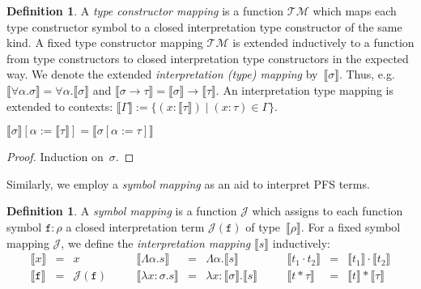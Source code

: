 \documentclass[a4paper,UKenglish,cleveref,autoref,numberwithinsect]{lipics-v2019}
\theoremstyle{definition}
\newtheorem{defn}[theorem]{Definition}
\newcommand{\arrtype}{\rightarrow}
\newcommand{\quant}[2]{\forall #1.#2}
\newcommand{\app}[2]{#1 \cdot #2}
\newcommand{\tapp}[2]{#1 * #2}
\newcommand{\abs}[2]{\lambda #1.#2}
\newcommand{\tabs}[2]{\Lambda #1.#2}
\newcommand{\typeinterpret}[1]{\llbracket #1 \rrbracket}
\newcommand{\interpret}[1]{\llbracket #1 \rrbracket}
\newcommand{\itp}[1]{\llbracket #1 \rrbracket}
\newcommand{\Typemap}{\mathcal{T\!M}}
\newcommand{\Termmap}{\mathcal{J}}
\begin{document}
\begin{defn}
  A \emph{type constructor mapping} is a function $\Typemap$ which
  maps each type constructor symbol to a closed interpretation type
  constructor of the same kind. A fixed type constructor mapping
  $\Typemap$ is extended inductively to a function from type
  constructors to closed interpretation type constructors in the
  expected way. We denote the extended \emph{interpretation (type)
    mapping} by~$\typeinterpret{\sigma}$. Thus,
  e.g.~$\typeinterpret{\quant{\alpha}{\sigma}} =
  \quant{\alpha}{\typeinterpret{\sigma}}$ and $\typeinterpret{\sigma
    \arrtype \tau} = \typeinterpret{\sigma} \arrtype
  \typeinterpret{\tau}$. An interpretation type mapping is extended to
  \pagebreak
  contexts: \( \itp{\Gamma} := \{ (x : \typeinterpret{\tau}) \mid (x :
  \tau) \in \Gamma \}.  \)
\end{defn}

\begin{lemma}\label{lem:substitutioninterpret:types}
  $\typeinterpret{\sigma}[\alpha:=\typeinterpret{\tau}] =
  \typeinterpret{\sigma[\alpha:=\tau]}$
\end{lemma}

\begin{proof}
  Induction on~$\sigma$.
\end{proof}

Similarly, we employ a \emph{symbol mapping} as an aid to interpret
PFS terms.

\begin{defn}
  A \emph{symbol mapping} is a function $\Termmap$ which assigns to
  each function symbol $\mathtt{f} : \rho$ a closed interpretation
  term $\Termmap(\mathtt{f})$ of type~$\typeinterpret{\rho}$. For a
  fixed symbol mapping $\Termmap$, we define the \emph{interpretation
    mapping} $\interpret{s}$ inductively:
  \[
    \begin{array}{rclcrclcrcl}
      \interpret{x} & = & x &\quad&
      \interpret{\tabs{\alpha}{s}} & = & \tabs{\alpha}{\interpret{s}} &\quad&
      \interpret{\app{t_1}{t_2}} &=& \app{\interpret{t_1}}{\interpret{t_2}} \\
      \interpret{\mathtt{f}} &=& \Termmap(\mathtt{f}) & \quad &
      \interpret{\abs{x:\sigma}{s}} & = & \abs{x:\typeinterpret{\sigma}}{
                                          \interpret{s}} & \quad &
      \interpret{\tapp{t}{\tau}} &=& \tapp{\interpret{t}}{\typeinterpret{\tau}} \\
    \end{array}
  \]
\end{defn}
\end{document}
